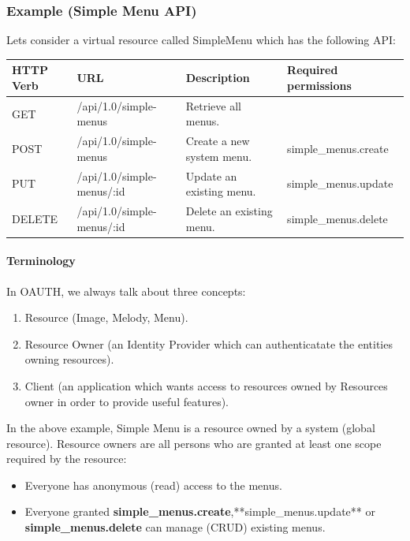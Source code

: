 \documentclass[letterpaper,10pt,english]{sphinxmanual}
\begin{document}
\subsubsection{Example (Simple Menu API)}
\label{features/oauth2/simple_api_example::doc}\label{features/oauth2/simple_api_example:example-simple-menu-api}
Lets consider a virtual resource called SimpleMenu which has the following API:

\begin{tabulary}{\linewidth}{|L|L|L|L|}
\hline

\textbf{HTTP Verb}
 & 
\textbf{URL}
 & 
\textbf{Description}
 & 
\textbf{Required permissions}
\\\hline

GET
 & 
/api/1.0/simple-menus
 & 
Retrieve all menus.
 & \\\hline

POST
 & 
/api/1.0/simple-menus
 & 
Create a new system menu.
 & 
simple\_menus.create
\\\hline

PUT
 & 
/api/1.0/simple-menus/:id
 & 
Update an existing menu.
 & 
simple\_menus.update
\\\hline

DELETE
 & 
/api/1.0/simple-menus/:id
 & 
Delete an existing menu.
 & 
simple\_menus.delete
\\\hline
\end{tabulary}



\paragraph{Terminology}
\label{features/oauth2/simple_api_example:terminology}
In OAUTH, we always talk about three concepts:
\begin{enumerate}
\item {} 
Resource (Image, Melody, Menu).

\item {} 
Resource Owner (an Identity Provider which can authenticatate the entities owning resources).

\item {} 
Client (an application which wants access to resources owned by Resources owner in order to provide useful features).

\end{enumerate}

In the above example, Simple Menu is a resource owned by a system (global resource). Resource owners are all persons who
are granted at least one scope required by the resource:
\begin{itemize}
\item {} 
Everyone has anonymous (read) access to the menus.

\item {} 
Everyone granted \textbf{simple\_menus.create},**simple\_menus.update** or \textbf{simple\_menus.delete} can manage (CRUD) existing menus.

\end{itemize}
\end{document}
